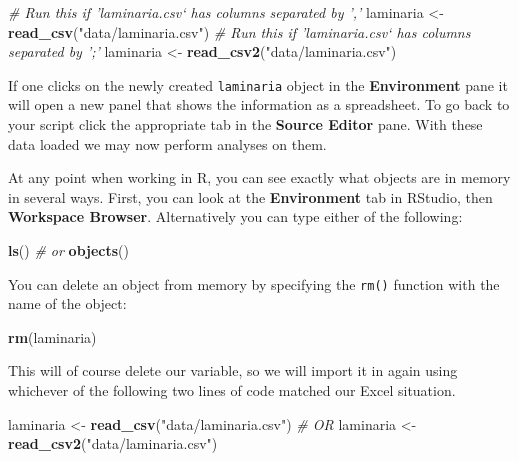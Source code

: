 \documentclass[]{book}
\newenvironment{Shaded}{\begin{snugshade}}{\end{snugshade}}
\newcommand{\KeywordTok}[1]{\textcolor[rgb]{0.13,0.29,0.53}{\textbf{#1}}}
\newcommand{\StringTok}[1]{\textcolor[rgb]{0.31,0.60,0.02}{#1}}
\newcommand{\CommentTok}[1]{\textcolor[rgb]{0.56,0.35,0.01}{\textit{#1}}}
\newcommand{\NormalTok}[1]{#1}
\theoremstyle{definition}
\theoremstyle{definition}
\theoremstyle{definition}
\theoremstyle{remark}
\begin{document}
\begin{Shaded}
\begin{Highlighting}[]
\CommentTok{# Run this if 'laminaria.csv` has columns separated by ','}
\NormalTok{laminaria <-}\StringTok{ }\KeywordTok{read_csv}\NormalTok{(}\StringTok{"data/laminaria.csv"}\NormalTok{)}
\CommentTok{# Run this if 'laminaria.csv` has columns separated by ';'}
\NormalTok{laminaria <-}\StringTok{ }\KeywordTok{read_csv2}\NormalTok{(}\StringTok{"data/laminaria.csv"}\NormalTok{)}
\end{Highlighting}
\end{Shaded}

If one clicks on the newly created \texttt{laminaria} object in the
\textbf{Environment} pane it will open a new panel that shows the
information as a spreadsheet. To go back to your script click the
appropriate tab in the \textbf{Source Editor} pane. With these data
loaded we may now perform analyses on them.

At any point when working in R, you can see exactly what objects are in
memory in several ways. First, you can look at the \textbf{Environment}
tab in RStudio, then \textbf{Workspace Browser}. Alternatively you can
type either of the following:

\begin{Shaded}
\begin{Highlighting}[]
\KeywordTok{ls}\NormalTok{()}
\CommentTok{# or}
\KeywordTok{objects}\NormalTok{()}
\end{Highlighting}
\end{Shaded}

You can delete an object from memory by specifying the \texttt{rm()}
function with the name of the object:

\begin{Shaded}
\begin{Highlighting}[]
\KeywordTok{rm}\NormalTok{(laminaria)}
\end{Highlighting}
\end{Shaded}

This will of course delete our variable, so we will import it in again
using whichever of the following two lines of code matched our Excel
situation.

\begin{Shaded}
\begin{Highlighting}[]
\NormalTok{laminaria <-}\StringTok{ }\KeywordTok{read_csv}\NormalTok{(}\StringTok{"data/laminaria.csv"}\NormalTok{)}
\CommentTok{# OR}
\NormalTok{laminaria <-}\StringTok{ }\KeywordTok{read_csv2}\NormalTok{(}\StringTok{"data/laminaria.csv"}\NormalTok{)}
\end{Highlighting}
\end{Shaded}
\end{document}

